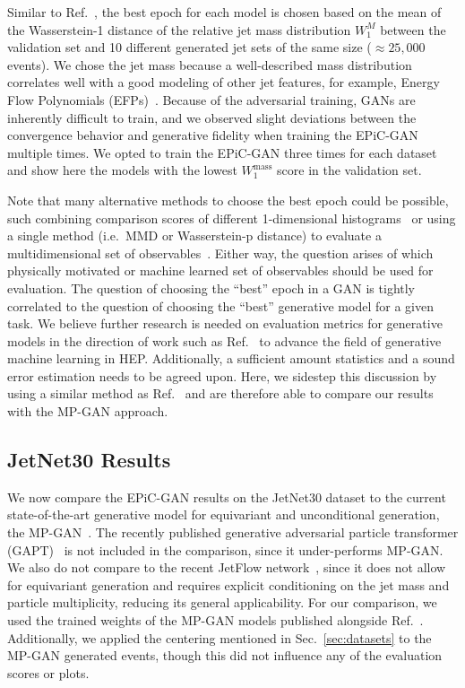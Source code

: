 \documentclass[a4paper,submission, Phys]{SciPost}
\DeclareRobustCommand{\Sec}[1]{Sec.~\ref{sec:#1}}
\DeclareRobustCommand{\Reff}[1]{Ref.~\cite{#1}}
\begin{document}
Similar to \Reff{MPGAN}, the best epoch for each model is chosen based on the mean of the Wasserstein-1 distance of the relative jet mass distribution $W_1^M$ between the validation set and 10 different generated jet sets of the same size ($\approx 25,000$ events). 
%
We chose the jet mass because a well-described mass distribution correlates well with a good modeling of other jet features, for example, Energy Flow Polynomials (EFPs)~\cite{EFPs}. 
%
Because of the adversarial training, GANs are inherently difficult to train, and we observed slight deviations between the convergence behavior and generative fidelity when training the EPiC-GAN multiple times. 
%
We opted to train the EPiC-GAN three times for each dataset and show here the models with the lowest $W_1^\mathrm{mass}$ score in the validation set. 


Note that many alternative methods to choose the best epoch could be possible, such combining comparison scores of different 1-dimensional histograms~\cite{decoding_photons} or using a single method (i.e.~MMD or Wasserstein-p distance) to evaluate a multidimensional set of observables~\cite{RaghavMetrics}. 
%
Either way, the question arises of which physically motivated or machine learned set of observables should be used for evaluation. 
%
The question of choosing the ``best'' epoch in a GAN is tightly correlated to the question of choosing the ``best'' generative model for a given task. 
%
We believe further research is needed on evaluation metrics for generative models in the direction of work such as \Reff{RaghavMetrics} to advance the field of generative machine learning in HEP.
%
Additionally, a sufficient amount statistics and a sound error estimation needs to be agreed upon.
%
Here, we sidestep this discussion by using a similar method as \Reff{MPGAN} and are therefore able to compare our results with the MP-GAN approach.


\subsection{JetNet30 Results}
\label{sec:JetNet30}

We now compare the EPiC-GAN results on the JetNet30 dataset to the current state-of-the-art generative model for equivariant and unconditional generation, the MP-GAN~\cite{MPGAN}.
%
The recently published generative adversarial particle transformer (GAPT)~\cite{RaghavMetrics} is not included in the comparison, since it under-performs MP-GAN.
%
We also do not compare to the recent JetFlow network~\cite{JetFlow}, since it does not allow for equivariant generation and requires explicit conditioning on the jet mass and particle multiplicity, reducing its general applicability.
%
For our comparison, we used the trained weights of the MP-GAN models published alongside \Reff{MPGAN}.
%
Additionally, we applied the centering mentioned in \Sec{datasets} to the MP-GAN generated events, though this did not influence any of the evaluation scores or plots.
\end{document}
